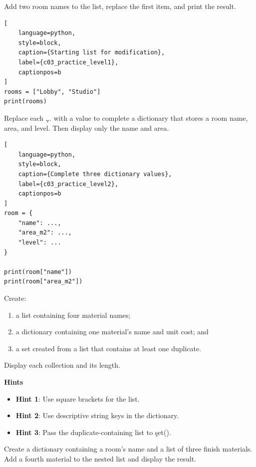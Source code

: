 
Add two room names to the list, replace the first item, and print the result.

\begin{lstlisting}[
    language=python,
    style=block,
    caption={Starting list for modification},
    label={c03_practice_level1},
    captionpos=b
]
rooms = ["Lobby", "Studio"]
print(rooms)
\end{lstlisting}


Replace each \c{...} with a value to complete a dictionary that stores a room
name, area, and level. Then display only the name and area.

\begin{lstlisting}[
    language=python,
    style=block,
    caption={Complete three dictionary values},
    label={c03_practice_level2},
    captionpos=b
]
room = {
    "name": ...,
    "area_m2": ...,
    "level": ...
}

print(room["name"])
print(room["area_m2"])
\end{lstlisting}


Create:
\begin{enumerate}
    \item a list containing four material names;
    \item a dictionary containing one material's name and unit cost; and
    \item a set created from a list that contains at least one duplicate.
\end{enumerate}
Display each collection and its length.

\textbf{Hints}
\begin{itemize}
    \item \textbf{Hint 1}: Use square brackets for the list.
    \item \textbf{Hint 2}: Use descriptive string keys in the dictionary.
    \item \textbf{Hint 3}: Pass the duplicate-containing list to \c{set()}.
\end{itemize}


Create a dictionary containing a room's name and a list of three finish
materials. Add a fourth material to the nested list and display the result.



